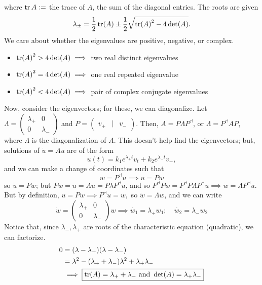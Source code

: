 \documentclass[12pt, oneside]{article}
\begin{document}
where $\trace A := $ the trace of $A$, the sum of the diagonal entries. The roots are given \[\lambda_\pm = \frac{1}{2}\tr(A) \pm \frac{1}{2}\sqrt{\tr(A)^2 - 4 \det(A)}.\]
We care about whether the eigenvalues are positive, negative, or complex.
\begin{itemize}
  \item $\tr (A)^2 > 4 \det (A) \implies $ two real distinct eigenvalues
  \item $\tr (A)^2 = 4 \det (A) \implies $ one real repeated eigenvalue
  \item $\tr (A)^2 < 4 \det (A) \implies $ pair of complex conjugate eigenvalues
\end{itemize}

Now, consider the eigenvectors; for these, we can diagonalize. Let $\Lambda = \begin{pmatrix}
  \lambda_+ & 0 \\
  0 & \lambda_-
\end{pmatrix}$ and $P = \begin{pmatrix}
  v_+ &| &v_-
\end{pmatrix}$. Then, $A = P \Lambda P^{\dashv}$, or $\Lambda = P^{\dashv}A P$, where $\Lambda$ is the diagonalization of $A$. This doesn't help find the eigenvectors; but, solutions of $\dot{u} = A u$ are of the form \[u(t) = k_1 e^{\lambda_+ t}v_t + k_2 e^{\lambda_- t}v_-,\] and we can make a change of coordinates such that \[w = P^{\dashv}u \implies u = P w\] so $\dot{u} = P \dot{w}$; but $P \dot{w} = \dot{u} = Au = P \lambda P^{\dashv} u$, and so $P^{\dashv} P \dot{w} = P^{\dashv} P \Lambda P^{\dashv} u \implies \dot{w} = \Lambda P^{\dashv} u$. But by definition, $u = Pw \implies P^{\dashv}u = w, $ so $\dot{w} = \Lambda w$, and we can write \[\dot{w} = \begin{pmatrix}
  \lambda_+ & 0 \\
  0 & \lambda_-
\end{pmatrix}w \implies \boxed{\dot{w_1} = \lambda_+ w_1; \quad \dot{w_2} = \lambda_- w_2}\]
Notice that, since $\lambda_-, \lambda_+$ are roots of the characteristic equation (quadratic), we can factorize.
\begin{align*}
  0 &= (\lambda-\lambda_+)(\lambda-\lambda_-)\\
  &= \lambda^2 - (\lambda_+ + \lambda_-)\lambda^2 + \lambda_+\lambda_-\\
  &\implies  \boxed{\trace (A) = \lambda_+ + \lambda_- \text{ and } \det(A) = \lambda_+ \lambda_-}
\end{align*}
\end{document}
